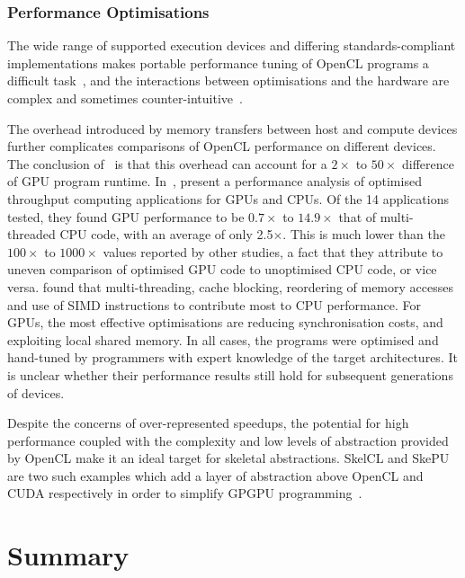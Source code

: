 \subsubsection{Performance Optimisations}

The wide range of supported execution devices and differing standards-compliant implementations makes portable performance tuning of OpenCL programs a difficult task~\cite{Rul2010}, and the interactions between optimisations and the hardware are complex and sometimes counter-intuitive~\cite{Ryoo2008}.

The overhead introduced by memory transfers between host and compute devices further complicates comparisons of OpenCL performance on different devices. The conclusion of~\cite{Gregg2011} is that this overhead can account for a $2\times$ to $50\times$ difference of GPU program runtime. In~\cite{Lee2010}, \citeauthor{Lee2010} present a performance analysis of optimised throughput computing applications for GPUs and CPUs. Of the 14 applications tested, they found GPU performance to be $0.7\times$ to $14.9\times$ that of multi-threaded CPU code, with an average of only 2.5$\times$. This is much lower than the $100\times$ to $1000\times$ values reported by other studies, a fact that they attribute to uneven comparison of optimised GPU code to unoptimised CPU code, or vice versa. \citeauthor{Lee2010} found that multi-threading, cache blocking, reordering of memory accesses and use of SIMD instructions to contribute most to CPU performance. For GPUs, the most effective optimisations are reducing synchronisation costs, and exploiting local shared memory. In all cases, the programs were optimised and hand-tuned by programmers with expert knowledge of the target architectures. It is unclear whether their performance results still hold for subsequent generations of devices.

Despite the concerns of over-represented speedups, the potential for high performance coupled with the complexity and low levels of abstraction provided by OpenCL make it an ideal target for skeletal abstractions. SkelCL and SkePU are two such examples which add a layer of abstraction above OpenCL and CUDA respectively in order to simplify GPGPU programming~\cite{Enmyren2010}.

\section{Summary}
\label{subsec:background-summary}

